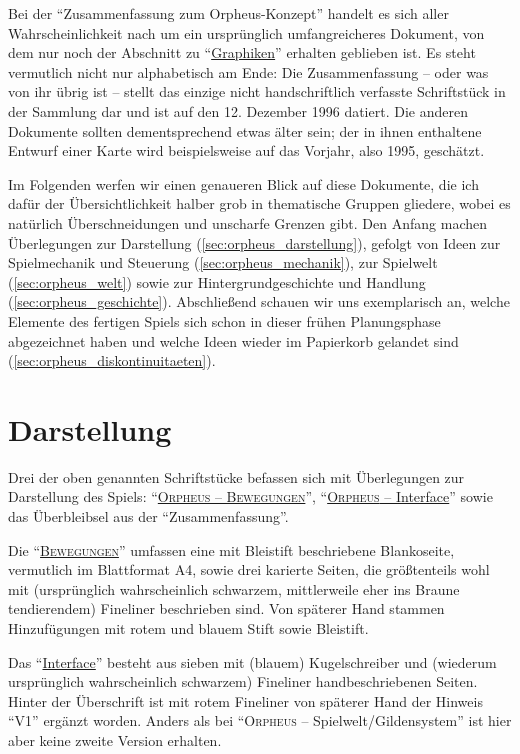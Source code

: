 \documentclass[a5paper,pagesize]{scrbook}
\begin{document}
Bei der \enquote{Zusammenfassung zum Orpheus-Konzept} handelt es sich aller Wahrscheinlichkeit nach um ein ursprünglich umfangreicheres Dokument, von dem nur noch der Abschnitt zu \enquote{\uline{Graphiken}} erhalten geblieben ist.\autocite[Vgl.][]{archive_orpheus_2024}
Es steht vermutlich nicht nur alphabetisch am Ende:
Die Zusammenfassung -- oder was von ihr übrig ist -- stellt das einzige nicht handschriftlich verfasste Schriftstück in der Sammlung dar und ist auf den 12. Dezember 1996 datiert.
Die anderen Dokumente sollten dementsprechend etwas älter sein; der in ihnen enthaltene Entwurf einer Karte wird beispielsweise auf das Vorjahr, also 1995, geschätzt.\autocite{flosha_evolution_2024}

Im Folgenden werfen wir einen genaueren Blick auf diese Dokumente, die ich dafür der Übersichtlichkeit halber grob in thematische Gruppen gliedere, wobei es natürlich Überschneidungen und unscharfe Grenzen gibt.
Den Anfang machen Überlegungen zur Darstellung (\autoref{sec:orpheus_darstellung}), gefolgt von Ideen zur Spielmechanik und Steuerung (\autoref{sec:orpheus_mechanik}), zur Spielwelt (\autoref{sec:orpheus_welt}) sowie zur Hintergrundgeschichte und Handlung (\autoref{sec:orpheus_geschichte}).
Abschließend schauen wir uns exemplarisch an, welche Elemente des fertigen Spiels sich schon in dieser frühen Planungsphase abgezeichnet haben und welche Ideen wieder im Papierkorb gelandet sind (\autoref{sec:orpheus_diskontinuitaeten}).


\section{Darstellung}\label{sec:orpheus_darstellung}
Drei der oben genannten Schriftstücke befassen sich mit Überlegungen zur Darstellung des Spiels:
\enquote{\uline{\textsc{Orpheus -- Bewegungen}}}, \enquote{\uline{\textsc{Orpheus} -- Interface}} sowie das Überbleibsel aus der \enquote{Zusammenfassung}.

Die \enquote{\uline{\textsc{Bewegungen}}}\autocite[Vgl.][]{orpheus_bewegungen} umfassen eine mit Bleistift beschriebene Blankoseite, vermutlich im Blattformat A4, sowie drei karierte Seiten, die größtenteils wohl mit (ursprünglich wahrscheinlich schwarzem, mittlerweile eher ins Braune tendierendem) Fineliner beschrieben sind.
Von späterer Hand stammen Hinzufügungen mit rotem und blauem Stift sowie Bleistift.

Das \enquote{\uline{Interface}}\autocite[Vgl.][]{orpheus_interface} besteht aus sieben mit (blauem) Kugelschreiber und (wiederum ursprünglich wahrscheinlich schwarzem) Fineliner handbeschriebenen Seiten.
Hinter der Überschrift ist mit rotem Fineliner von späterer Hand der Hinweis \enquote{V1} ergänzt worden. Anders als bei \enquote{\textsc{Orpheus} -- Spielwelt/Gildensys\-tem} ist hier aber keine zweite Version erhalten.
\end{document}
